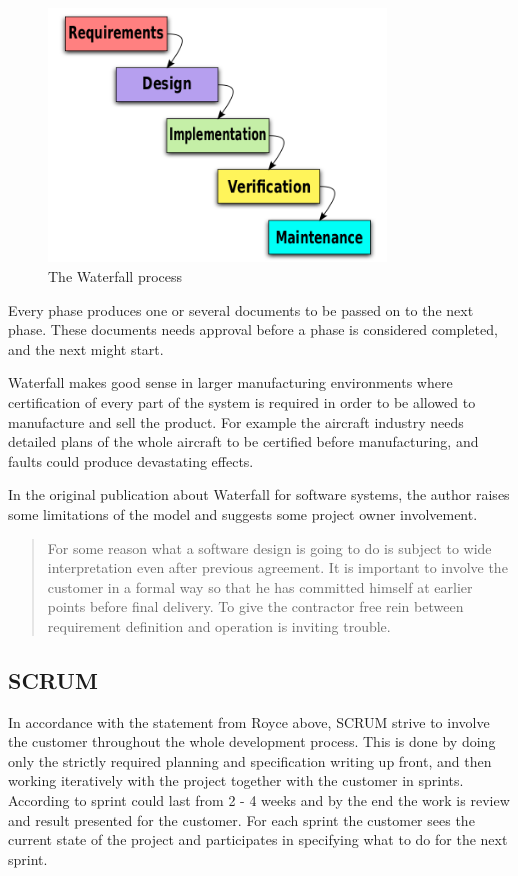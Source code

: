 \documentclass[11pt]{book}
\begin{document}
\begin{figure}[H]
      \centering
      \includegraphics[width=0.8\textwidth]{Figures/Prestudy/Waterfall.png}
      \caption{The Waterfall process \cite{wikipedia:waterfall}}
      \label{fig:pre_waterfall}
\end{figure}

Every phase produces one or several documents to be passed on to the next phase. These documents needs approval before a phase is considered completed, and the next might start.

Waterfall makes good sense in larger manufacturing environments where certification of every part of the system is required in order to be allowed to manufacture and sell the product. For example the aircraft industry needs detailed plans of the whole aircraft to be certified before manufacturing, and faults could produce devastating effects.

In the original publication about Waterfall for software systems, the author raises some limitations of the model and suggests some project owner involvement.

\begin{quotation}
For some reason what a software design is going to do is subject to wide interpretation even after previous agreement. It is important to involve the customer in a formal way so that he has committed himself at earlier points before final delivery. To give the contractor free rein between requirement definition and operation is inviting trouble. \cite[p. 335]{DBLP:conf/icse/Royce87}
\end{quotation}

\subsection{SCRUM}
In accordance with the statement from Royce above, SCRUM strive to involve the customer throughout the whole development process. This is done by doing only the strictly required planning and specification writing up front, and then working iteratively with the project together with the customer in sprints. According to \cite[p. 73]{Sommerville10} sprint could last from 2 - 4 weeks and by the end the work is review and result presented for the customer. For each sprint the customer sees the current state of the project and participates in specifying what to do for the next sprint.
\end{document}
